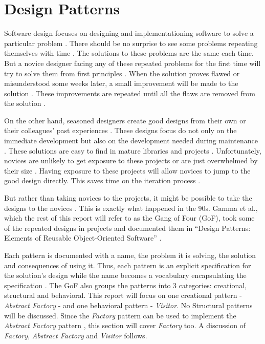 \section{Design Patterns}
Software design focuses on designing and implementationing software to solve a particular problem \cite{ieee_1016-2009, satzinger_15_01}.
There should be no surprise to see some problems repeating themselves with time \cite{keshvari_11_01}.
The solutions to these problems are the same each time.
But a novice designer facing any of these repeated problems for the first time will try to solve them from first principles \cite{gamma_94_01, sonnentag_98_01}.
When the solution proves flawed or misunderstood some weeks later, a small improvement will be made to the solution \cite{zhu_05_01, ieee_1016-2009}.
These improvements are repeated until all the flaws are removed from the solution \cite{stephens_15_01, satzinger_15_01}.

On the other hand, seasoned designers create good designs from their own or their colleagues' past experiences \cite{sonnentag_98_01}.
These designs focus do not only on the immediate development but also on the development needed during maintenance \cite{kerievsky_05_01,gamma_94_01}.
These solutions are easy to find in mature libraries and projects \cite{gamma_94_01}.
Unfortunately, novices are unlikely to get exposure to these projects \cite{zhu_05_01} or are just overwhelmed by their size \cite{hu_18_01}.
Having exposure to these projects will allow novices to jump to the good design directly.
This saves time on the iteration process \cite{satzinger_15_01}.

But rather than taking novices to the projects, it might be possible to take the designs to the novices \cite{kim_03_01}.
This is exactly what happened in the 90s.
Gamma et al., which the rest of this report will refer to as the Gang of Four (GoF), took some of the repeated designs in projects and documented them in ``Design Patterns: Elements of Reusable Object-Oriented Software'' \cite{gamma_94_01}.

Each pattern is documented with a name, the problem it is solving, the solution and consequences of using it.
Thus, each pattern is an explicit specification for the solution's design while the name becomes a vocabulary encapsulating the specification \cite{gamma_94_01, bulajic_12_01}.
The GoF also groups the patterns into 3 categories: creational, structural and behavioral.
This report will focus on one creational pattern - \textit{Abstract Factory} - and one behavioral pattern - \textit{Visitor}.
No Structural patterns will be discussed.
Since the \textit{Factory} pattern can be used to implement the \textit{Abstract Factory} pattern \cite{nykonenko_12_01, gamma_94_01}, this section will cover \textit{Factory} too.
A discussion of \textit{Factory}, \textit{Abstract Factory} and \textit{Visitor} follows.

